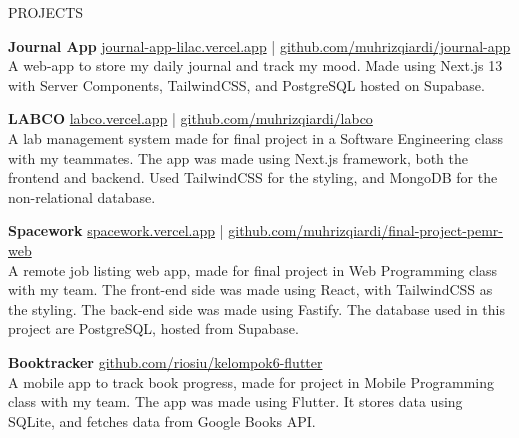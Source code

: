 \documentclass{resume}
\begin{document}
\begin{rSection}{PROJECTS}
\vspace{-1.25em}
\item \textbf{Journal App} {\hfill \href{https://journal-app-lilac.vercel.app/}{journal-app-lilac.vercel.app} | \href{https://github.com/muhrizqiardi/journal-app}{github.com/muhrizqiardi/journal-app}\\
A web-app to store my daily journal and track my mood. Made using Next.js 13 with Server Components, TailwindCSS, and PostgreSQL hosted on Supabase.}
\item \textbf{LABCO} {\hfill \href{https://labco.vercel.app/}{labco.vercel.app} | \href{https://github.com/muhrizqiardi/labco}{github.com/muhrizqiardi/labco}\\
A lab management system made for final project in a Software Engineering class with my teammates. The app was made using Next.js framework, both the frontend and backend. Used TailwindCSS for the styling, and MongoDB for the non-relational database.}
\item \textbf{Spacework} {\hfill \href{https://spacework.vercel.app/}{spacework.vercel.app} | \href{https://github.com/muhrizqiardi/final-project-pemr-web}{github.com/muhrizqiardi/final-project-pemr-web}\\
A remote job listing web app, made for final project in Web Programming class with my team. The front-end side was made using React, with TailwindCSS as the styling. The back-end side was made using Fastify. The database used in this project are PostgreSQL, hosted from Supabase.}
\item \textbf{Booktracker} {\hfill\href{https://github.com/riosiu/kelompok6-flutter}{github.com/riosiu/kelompok6-flutter}\\
A mobile app to track book progress, made for project in Mobile Programming class with my team. The app was made using Flutter. It stores data using SQLite, and fetches data from Google Books API.}
\end{rSection} 
\end{document}
